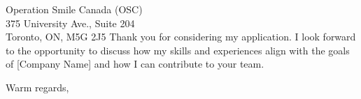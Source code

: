 \documentclass{letter}
\begin{document}
\begin{letter}{Operation Smile Canada (OSC) \\ 375 University Ave., Suite 204 \\ Toronto, ON, M5G 2J5}
Thank you for considering my application. I look forward to the opportunity to discuss how my skills and experiences align with the goals of [Company Name] and how I can contribute to your team.
\closing{Warm regards,}

\end{letter}
\end{document}
